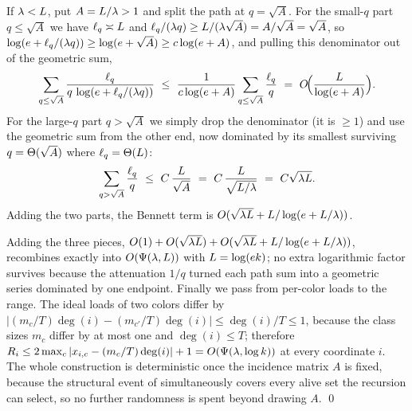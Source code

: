 If $\lambda<L$, put $A=L/\lambda>1$ and split the path at $q=\sqrt A$. For the small-$q$ part $q\le\sqrt A$ we have
$\ell_q\asymp L$ and $\ell_q/(\lambda q)\ge L/(\lambda\sqrt A)=A/\sqrt A=\sqrt A$, so
$\log(e+\ell_q/(\lambda q))\ge\log(e+\sqrt A)\ge c\log(e+A)$, and pulling this denominator out of the geometric sum,
\[
  \sum_{q\le\sqrt A}\frac{\ell_q}{q\,\log(e+\ell_q/(\lam q))}\ \le\ \frac{1}{c\log(e+A)}\sum_{q\le\sqrt A}\frac{\ell_q}{q}
  \ =\ \Oh\!\Big(\frac{\Lscale}{\log(e+A)}\Big).
\]
For the large-$q$ part $q>\sqrt A$ we simply drop the denominator (it is $\ge1$) and use the geometric sum from the other
end, now dominated by its smallest surviving $q=\Theta(\sqrt A)$ where $\ell_q=\Theta(L)$:
\[
  \sum_{q>\sqrt A}\frac{\ell_q}{q}\ \le\ C\,\frac{\Lscale}{\sqrt A}\ =\ C\,\frac{\Lscale}{\sqrt{\Lscale/\lam}}\ =\ C\sqrt{\lam\Lscale}.
\]
Adding the two parts, the Bennett term is $O(\sqrt{\lambda L}+L/\log(e+L/\lambda))$.

Adding the three pieces, $O(1)+O(\sqrt{\lambda L})+O(\sqrt{\lambda L}+L/\log(e+L/\lambda))$, recombines
exactly into $O(\Psi(\lambda,L))$ with $L=\log(ek)$; no extra logarithmic factor survives because the
attenuation $1/q$ turned each path sum into a geometric series dominated by one endpoint. Finally we pass from per-color
loads to the range. The ideal loads of two colors differ by
$|(m_c/T)\deg(i)-(m_{c'}/T)\deg(i)|\le\deg(i)/T\le 1$, because the class sizes $m_c$ differ by at most one and
$\deg(i)\le T$; therefore $R_i\le 2\max_c|x_{i,c}-(m_c/T)\deg(i)|+1=O(\Psi(\lambda,\log k))$ at every coordinate
$i$. The whole construction is deterministic once the incidence matrix $A$ is fixed, because the structural event of
 simultaneously covers every alive set the recursion can select, so no further randomness is spent
beyond drawing $A$. \qed
